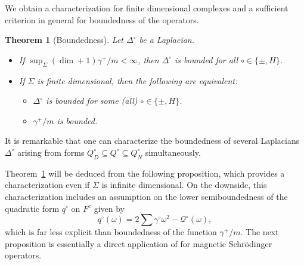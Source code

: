 \documentclass[10pt]{amsart}
\newtheorem{theorem}{Theorem}[section]
\theoremstyle{definition}
\newcommand{\F}{{F}}
\renewcommand{\bullet}{{\circ}}
\newcommand{\Q}{\mathcal{Q}}
\begin{document}
We obtain a characterization for finite dimensional complexes and a sufficient criterion in general for boundedness of the operators.
\begin{theorem}[Boundedness]\label{bounddim} 
	Let $\Delta^{\bullet}$ be a Laplacian.
	\begin{itemize}
		\item [(a)]	If $\sup_\Sigma(\dim+1)\gamma^+\slash m<\infty$, then $\Delta^\bullet$ is bounded for all $\bullet\in\{\pm,H\}$. 
		\item [(b)]If  $\Sigma$ is finite dimensional, then the following are equivalent:
		\begin{itemize}
			\item [(i)]  $\Delta^{\bullet}$ is bounded for some (all) $\bullet\in\{\pm,H\}$.
			\item[(ii)] $\gamma^{+}\slash m$ is bounded.
		\end{itemize} 
	\end{itemize}
	
\end{theorem}
It is remarkable that one can characterize the  boundedness of several Laplacians $\Delta^{\bullet}$ arising from forms $Q^{\bullet}_{D}\subseteq Q^{\bullet}\subseteq Q^{\bullet}_{N}$ simultaneously. %


 
Theorem~\ref{bounddim}  will be deduced from the following proposition, which provides a characterization even if $\Sigma$ is infinite dimensional. On the downside, this characterization includes an assumption on the lower semiboundedness of the quadratic form $q^{\bullet}$ on $\F^c$ given by
$$q^\bullet(\omega) = 2\sum \gamma^\bullet\omega^2-\Q^\bullet(\omega),$$
which is far less explicit than boundedness of the function $\gamma^{+}/m$. The next proposition is essentially a direct application of \cite[Theorem~4.1]{S} for magnetic Schrödinger operators.
\end{document}
